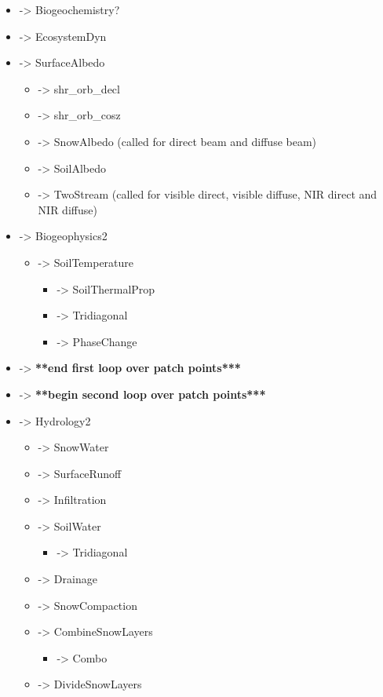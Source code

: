 \documentclass[]{article}
\begin{document}
\begin{itemize}
\begin{itemize}
  \end{itemize}
\item ->  Biogeochemistry? 
\item ->  EcosystemDyn 
\item ->  SurfaceAlbedo 
  \begin{itemize}
  \item ->  shr\_orb\_decl 
  \item ->  shr\_orb\_cosz 
  \item ->  SnowAlbedo (called for direct beam and diffuse beam) 
  \item ->  SoilAlbedo 
  \item ->  TwoStream (called for visible direct, visible diffuse, NIR direct and NIR diffuse) 
  \end{itemize}
\item ->  Biogeophysics2 
  \begin{itemize}
  \item ->  SoilTemperature 
    \begin{itemize}
    \item ->  SoilThermalProp 
    \item ->  Tridiagonal 
    \item ->  PhaseChange 
    \end{itemize}
  \end{itemize}
\item -> {\bf ***end first loop over patch points***} 
\item -> {\bf ***begin second loop over patch points***} 
\item ->  Hydrology2 
   \begin{itemize}
   \item ->  SnowWater 
   \item ->  SurfaceRunoff 
   \item ->  Infiltration 
   \item ->  SoilWater 
     \begin{itemize}
     \item -> Tridiagonal 
     \end{itemize}
   \item ->  Drainage 
   \item ->  SnowCompaction 
   \item ->  CombineSnowLayers 
     \begin{itemize}
     \item -> Combo 
     \end{itemize}
   \item ->  DivideSnowLayers 

\end{itemize}
\end{itemize}
\end{document}
